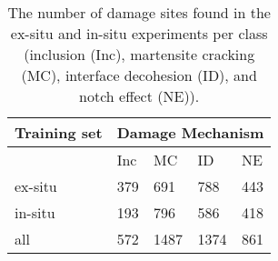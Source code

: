 \begin{table}[H]
\begin{center}
\begin{tabular}{@{} *5l @{}} \toprule[2pt]
Training set &  \multicolumn{4}{c}{Damage Mechanism}   \\\midrule
 & Inc & MC & ID & NE   \\ 
ex-situ  & 379 & 691 & 788 & 443\\ 
in-situ  & 193 & 796 & 586 & 418 \\ \bottomrule
all  & 572 & 1487 & 1374 & 861\\\bottomrule[2pt]

\end{tabular}
 \caption{The number of damage sites found in the ex-situ and in-situ experiments per class (inclusion (Inc), martensite cracking (MC), interface decohesion (ID), and notch effect (NE)).}
 \label{tab:Dataset}
\end{center}
\end{table}